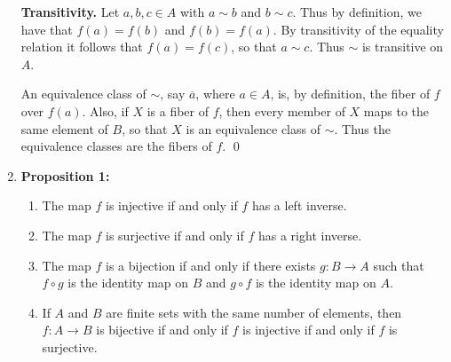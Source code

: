 \begin{enumerate}
      \textbf{Transitivity.} Let $a, b, c \in A$ with $a \sim b$ and $b \sim c$.
      Thus by definition, we have that $f(a) = f(b)$ and $f(b) = f(a)$. By
      transitivity of the equality relation it follows that $f(a) = f(c)$, so 
      that $a \sim c$. Thus $\sim$ is transitive on $A$.


      An equivalence class of $\sim$, say $\overline{a}$, where $a \in A$, is,
      by definition, the fiber of $f$ over $f(a)$. Also, if $X$ is a fiber of
      $f$, then every member of $X$ maps to the same element of $B$, so that $X$
      is an equivalence class of $\sim$. Thus the equivalence classes are the 
      fibers of $f$. \qed
   \item[0.1.8] \textbf{Proposition 1:}
                \begin{enumerate}
                   \item The map $f$ is injective if and only if $f$ has a left
                         inverse.
                   \item The map $f$ is surjective if and only if $f$ has a
                         right inverse.
                   \item The map $f$ is a bijection if and only if there exists
                         $g : B \rightarrow A$ such that $f \circ g$ is the
                         identity map on $B$ and $g \circ f$ is the identity map
                         on $A$.
                   \item If $A$ and $B$ are finite sets with the same number of
                         elements, then $f : A \rightarrow B$ is bijective if
                         and only if $f$ is injective if and only if $f$ is
                         surjective.
                \end{enumerate}


\end{enumerate}
